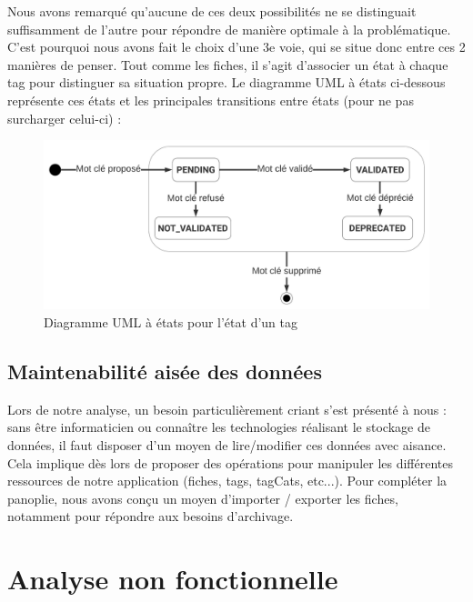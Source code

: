 Nous avons remarqué qu'aucune de ces deux possibilités ne se distinguait suffisamment de l'autre pour répondre de manière optimale à la problématique.
C'est pourquoi nous avons fait le choix d'une 3e voie, qui se situe donc entre ces 2 manières de penser. Tout comme les \glspl{fiche}, il s'agit d'associer un état à chaque \gls{tag} pour distinguer sa situation propre. Le diagramme UML à états ci-dessous représente ces états et les principales transitions entre états (pour ne pas surcharger celui-ci) :

\begin{figure}[H]
    \includegraphics[width=\textwidth,height=\textheight,keepaspectratio]{images/StateTags.png}
    \centering
    \caption{Diagramme UML à états pour l'état d'un \gls{tag}}
    \label{pic:stateDiagramForTags}
\end{figure}

\subsection*{Maintenabilité aisée des données}

Lors de notre analyse, un besoin particulièrement criant s'est présenté à nous : sans être informaticien ou connaître les technologies réalisant le stockage de données, il faut disposer d'un moyen de lire/modifier ces données avec aisance. \\

Cela implique dès lors de proposer des opérations pour manipuler les différentes ressources de notre application (\glspl{fiche}, \glspl{tag}, \glspl{tagCat}, etc...). Pour compléter la panoplie, nous avons conçu un moyen d'importer / exporter les \glspl{fiche}, notamment pour répondre aux besoins d'archivage.

\pagebreak


\section{Analyse non fonctionnelle}
\label{section:AnalyseNonFonctionnelle}

